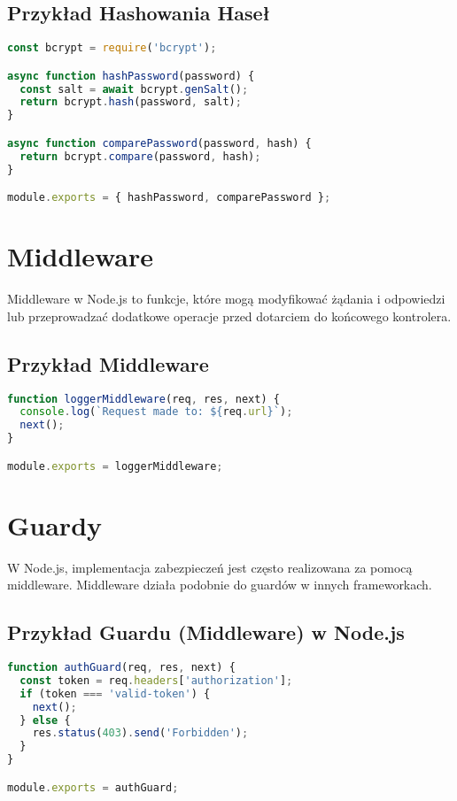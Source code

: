 \documentclass[a4paper,12pt]{article}
\begin{document}
\subsection{Przykład Hashowania Haseł}
\begin{lstlisting}[language=JavaScript, caption=Przykład hashowania haseł przy użyciu bcrypt]
const bcrypt = require('bcrypt');

async function hashPassword(password) {
  const salt = await bcrypt.genSalt();
  return bcrypt.hash(password, salt);
}

async function comparePassword(password, hash) {
  return bcrypt.compare(password, hash);
}

module.exports = { hashPassword, comparePassword };
\end{lstlisting}

\section{Middleware}
Middleware w Node.js to funkcje, które mogą modyfikować żądania i odpowiedzi lub przeprowadzać dodatkowe operacje przed dotarciem do końcowego kontrolera.

\subsection{Przykład Middleware}
\begin{lstlisting}[language=JavaScript, caption=Przykład middleware w Node.js]
function loggerMiddleware(req, res, next) {
  console.log(`Request made to: ${req.url}`);
  next();
}

module.exports = loggerMiddleware;
\end{lstlisting}

\section{Guardy}
W Node.js, implementacja zabezpieczeń jest często realizowana za pomocą middleware. Middleware działa podobnie do guardów w innych frameworkach.

\subsection{Przykład Guardu (Middleware) w Node.js}
\begin{lstlisting}[language=JavaScript, caption=Przykład guardu w Node.js]
function authGuard(req, res, next) {
  const token = req.headers['authorization'];
  if (token === 'valid-token') {
    next();
  } else {
    res.status(403).send('Forbidden');
  }
}

module.exports = authGuard;
\end{lstlisting}
\end{document}
